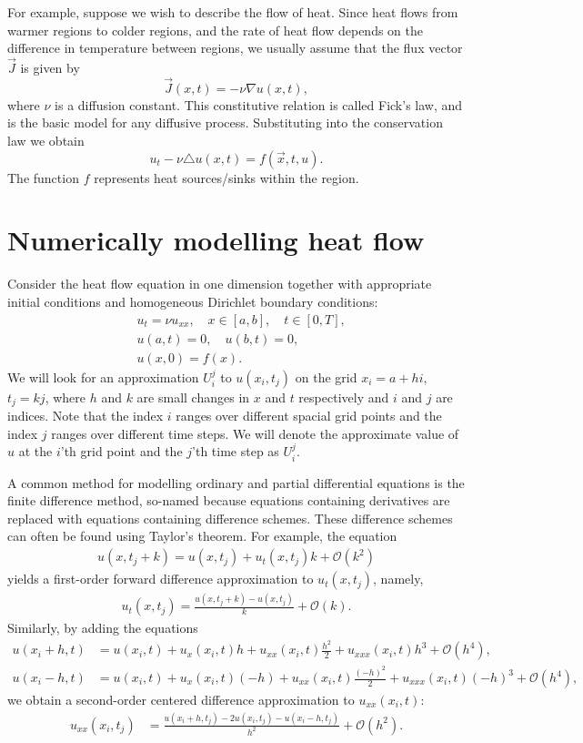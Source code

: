 For example, suppose we wish to describe the flow of heat.
Since heat flows from warmer regions to colder regions, and the rate of heat flow depends on the difference in temperature between regions, we usually assume that the flux vector $\vec{J}$ is given by 
\[\vec{J}(x,t) = -\nu \nabla u(x,t),\]
where $\nu$ is a diffusion constant.
This constitutive relation is called Fick's law, and is the basic model for any diffusive process.
Substituting into the conservation law we obtain 
\[u_t -\nu \triangle u(x,t) = f(\vec{x},t,u).\]  
The function $f$ represents heat sources/sinks within the region. 

\section{Numerically modelling heat flow}
Consider the heat flow equation in one dimension together with appropriate initial conditions and homogeneous Dirichlet boundary conditions: 
\begin{align*}
	&{ } u_t = \nu u_{xx}, \quad x \in [a,b],\quad t \in [0,T], \\
	&{ } u(a,t) = 0,\quad u(b,t) = 0,\\
	&{ } u(x,0) = f(x).
\end{align*}
We will look for an approximation $U^j_i$ to $u(x_i,t_j)$ on the grid $x_i = a +  hi$, $t_j = kj$, where $h$ and $k$ are small changes in $x$ and $t$ respectively and $i$ and $j$ are indices.
Note that the index $i$ ranges over different spacial grid points and the index $j$ ranges over different time steps.
We will denote the approximate value of $u$ at the $i$'th grid point and the $j$'th time step as $U_i^j$.

A common method for modelling ordinary and partial differential equations is the finite difference method, so-named because equations containing derivatives are replaced with equations containing difference schemes.
These difference schemes can often be found using Taylor's theorem.
For example, the equation 
\begin{align*}
	u(x,t_j + k) = u(x,t_j) + u_t(x,t_j)k + \mathcal{O}(k^2)
\end{align*}
yields a first-order forward difference approximation to $u_t(x,t_j)$, namely, 
\begin{align*}
	u_t(x,t_j ) = \frac{u(x,t_j+k) - u(x,t_j)}{k} + \mathcal{O}(k).
\end{align*}
Similarly, by adding the equations 
\begin{align*}
	u(x_i+h,t) &= u(x_i,t) + u_x(x_i,t)h + u_{xx}(x_i,t)\frac{h^2}{2} + u_{xxx}(x_i,t)h^3 + \mathcal{O}(h^4),\\
	u(x_i-h,t) &= u(x_i,t) + u_x(x_i,t)(-h) + u_{xx}(x_i,t)\frac{(-h)^2}{2} + u_{xxx}(x_i,t)(-h)^3 + \mathcal{O}(h^4),
\end{align*}
we obtain a second-order centered difference approximation to $u_{xx}(x_i,t)$:
\begin{align*}
	u_{xx}(x_i,t_j) &= \frac{u(x_i + h,t_j )-2 u(x_i,t_j)- u(x_i - h,t_j)}{h^2} + \mathcal{O}(h^2).
\end{align*}

